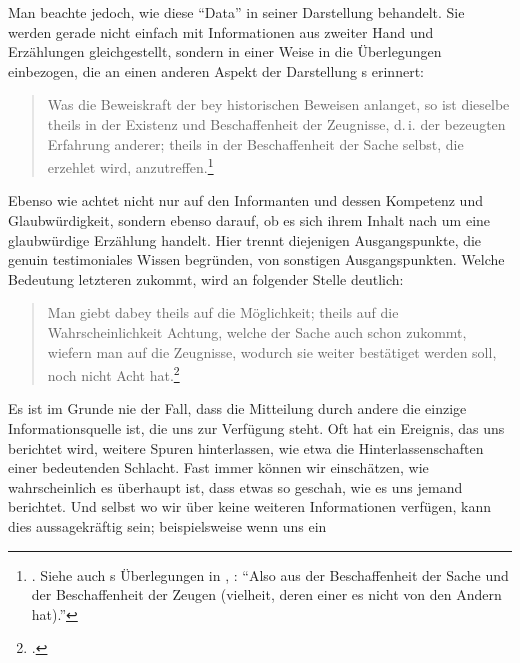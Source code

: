 Man beachte jedoch, wie 
diese \enquote{Data} in seiner Darstellung behandelt. Sie werden gerade nicht
einfach mit Informationen aus zweiter Hand und Erzählungen gleichgestellt, sondern in einer
Weise in die Überlegungen einbezogen, die an einen anderen Aspekt der
Darstellung s erinnert:
\begin{quote}
  Was die Beweiskraft der  bey historischen Beweisen anlanget, so
  ist dieselbe theils in der Existenz und Beschaffenheit der Zeugnisse, d.\,i.
  der bezeugten Erfahrung anderer; theils in der Beschaffenheit der Sache selbst,
  die erzehlet wird,
  anzutreffen.\footnote{\Cite[][\S~609]{Crusius:WegzurGewissheitundZuverlaessigkeitdermenschlichenErkenntniss1965}.
  Siehe auch s Überlegungen in
  \cite[][]{Kant:Reflexionen1900ff.},
  \cite[][XVI: 430.14--15]{Kant:GesammelteWerke1900ff.}: \enquote{Also aus der
  Beschaffenheit der Sache und der Beschaffenheit der Zeugen (vielheit, deren einer es nicht von den Andern hat).} }
\end{quote}
Ebenso wie  achtet
 nicht nur auf den
Informanten und dessen Kompetenz und Glaubwürdigkeit, sondern ebenso darauf, ob
es sich ihrem Inhalt nach um eine glaubwürdige Erzählung handelt. Hier trennt
 diejenigen
Ausgangspunkte, die genuin testimoniales Wissen begründen, von sonstigen
Ausgangspunkten. Welche Bedeutung letzteren zukommt, wird an folgender Stelle
deutlich:
\begin{quote}
  Man giebt dabey theils auf die Möglichkeit; theils auf die Wahrscheinlichkeit
  Achtung, welche der Sache auch schon zukommt, wiefern man auf die Zeugnisse,
  wodurch sie weiter bestätiget werden soll, noch nicht Acht
  hat.\footnote{\Cite[][\S~609]{Crusius:WegzurGewissheitundZuverlaessigkeitdermenschlichenErkenntniss1965}.}
\end{quote}
Es ist im Grunde nie der Fall, dass die Mitteilung durch andere die einzige
Informationsquelle ist, die uns zur Verfügung steht. Oft hat ein
Ereignis, das uns berichtet wird, weitere Spuren hinterlassen, wie etwa die
Hinterlassenschaften einer bedeutenden Schlacht. Fast immer können wir
einschätzen, wie wahrscheinlich es überhaupt ist, dass etwas so geschah, wie es
uns jemand berichtet. Und selbst wo wir über keine weiteren Informationen
verfügen, kann dies aussagekräftig sein; beispielsweise wenn uns ein
